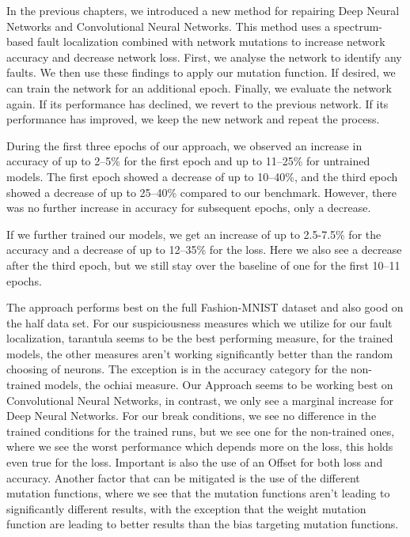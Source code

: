 In the previous chapters, we introduced a new method for repairing Deep Neural Networks and Convolutional Neural Networks.
This method uses a spectrum-based fault localization combined with network mutations to increase network accuracy and decrease network loss.
First, we analyse the network to identify any faults.
We then use these findings to apply our mutation function.
If desired, we can train the network for an additional epoch.
Finally, we evaluate the network again.
If its performance has declined, we revert to the previous network.
If its performance has improved, we keep the new network and repeat the process.

During the first three epochs of our approach, we observed an increase in accuracy of up to 2--5\% for the first epoch and up to 11--25\% for untrained models.
The first epoch showed a decrease of up to 10--40\%, and the third epoch showed a decrease of up to 25--40\% compared to our benchmark.
However, there was no further increase in accuracy for subsequent epochs, only a decrease.

If we further trained our models, we get an increase of up to 2.5-7.5\% for the accuracy and a decrease of up to 12--35\% for the loss.
Here we also see a decrease after the third epoch, but we still stay over the baseline of one for the first 10–11 epochs.

The approach performs best on the full Fashion-MNIST dataset and also good on the half data set.
For our suspiciousness measures which we utilize for our fault localization, tarantula seems to be the best performing measure, for the trained models, the other measures aren't working significantly better than the random choosing of neurons.
The exception is in the accuracy category for the non-trained models, the ochiai measure.
Our Approach seems to be working best on Convolutional Neural Networks, in contrast, we only see a marginal increase for Deep Neural Networks.
For our break conditions, we see no difference in the trained conditions for the trained runs, but we see one for the non-trained ones, where we see the worst performance which depends more on the loss, this holds even true for the loss.
Important is also the use of an Offset for both loss and accuracy.
Another factor that can be mitigated is the use of the different mutation functions, where we see that the mutation functions aren't leading to significantly different results, with the exception that the weight mutation function are leading to better results than the bias targeting mutation functions.

